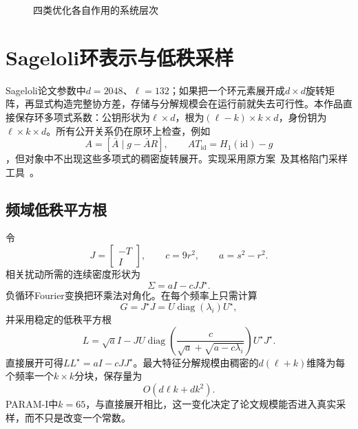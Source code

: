 \documentclass[UTF8,a4paper,12pt,oneside,openany,fontset=fandol]{ctexrep}
\begin{document}
\begin{figure}[htbp]
\centering
{}
\caption{四类优化各自作用的系统层次}
\label{fig:optimization-layers}
\end{figure}

\section{Sageloli环表示与低秩采样}
Sageloli论文参数中$d=2048$、$\ell=132$；如果把一个环元素展开成$d\times d$旋转矩阵，再显式构造完整协方差，存储与分解规模会在运行前就失去可行性。本作品直接保存环多项式系数：公钥形状为$\ell\times d$，根为$(\ell-k)\times k\times d$，身份钥为$\ell\times k\times d$。所有公开关系仍在原环上检查，例如
\[
  A=[\bar A\mid g-\bar A R],\qquad A T_{\mathrm{id}}=H_1(\mathrm{id})-g
\]
，但对象中不出现这些多项式的稠密旋转展开。实现采用原方案~\cite{sageloli2023ibs}及其格陷门采样工具~\cite{micciancio2012trapdoors}。

\subsection{频域低秩平方根}
令
\[
  J=\begin{bmatrix}-T\\I\end{bmatrix},\qquad
  c=9r^2,\qquad a=s^2-r^2.
\]
相关扰动所需的连续密度形状为
\[
  \Sigma=aI-cJJ^\star.
\]
负循环Fourier变换把环乘法对角化。在每个频率上只需计算
\[
  G=J^\star J=U\operatorname{diag}(\lambda_i)U^\star,
\]
并采用稳定的低秩平方根
\[
  L=\sqrt a I-
  JU\operatorname{diag}\!\left(
    \frac{c}{\sqrt a+\sqrt{a-c\lambda_i}}
  \right)U^\star J^\star.
\]
直接展开可得$LL^\star=aI-cJJ^\star$。最大特征分解规模由稠密的$d(\ell+k)$维降为每个频率一个$k\times k$分块，保存量为
\[
  O(d\ell k+dk^2).
\]
PARAM-I中$k=65$，与直接展开相比，这一变化决定了论文规模能否进入真实采样，而不只是改变一个常数。
\end{document}
